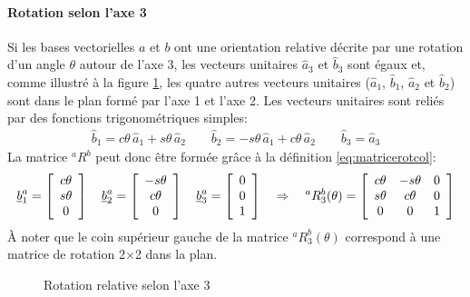 \paragraph{Rotation selon l'axe 3}
\label{sec:rot3}
%
Si les bases vectorielles $a$ et $b$ ont une orientation relative décrite par une rotation d'un angle $\theta$ autour de l'axe 3, les vecteurs unitaires $\hat{a}_3$ et $\hat{b}_3$ sont égaux et, comme illustré à la figure \ref{fig:r3vv}, les quatre autres vecteurs unitaires ($\hat{a}_1$, $\hat{b}_1$, $\hat{a}_2$ et $\hat{b}_2$) sont dans le plan formé par l'axe 1 et l'axe 2. Les vecteurs unitaires sont reliés par des fonctions trigonométriques simples: 
\begin{align}
\hat{b}_1 = c\theta \, \hat{a}_1 + s\theta \, \hat{a}_2 \quad\quad
\hat{b}_2 = -s\theta \, \hat{a}_1 + c\theta \, \hat{a}_2 \quad\quad
\hat{b}_3 = \hat{a}_3
\label{eq:rot3vecuni}
\end{align}
La matrice $^aR^b$ peut donc être formée grâce à la définition \eqref{eq:matricerotcol}:
\begin{align}
\underline{b}_1^a = \left[ \begin{array}{c} c\theta \\ s\theta \\ 0  \end{array} \right] \quad
\underline{b}_2^a = \left[ \begin{array}{c} -s\theta \\ c\theta \\ 0  \end{array} \right] \quad
\underline{b}_3^a = \left[ \begin{array}{c} 0 \\ 0 \\ 1  \end{array} \right]
\quad \Rightarrow \quad
^aR^b_3(\theta) = \left[ \begin{array}{c c c}
	c\theta & -s\theta & 0 \\
	s\theta & c\theta & 0 \\
	0 & 0 & 1 
\end{array}  \right]
\label{eq:rot3theta}
\end{align}
À noter que le coin supérieur gauche de la matrice $^aR^b_3(\theta)$ correspond à une matrice de rotation 2$\times$2 dans la plan.
%
\begin{figure}[H]
        \centering
				\hspace{+20pt}
        \caption{Rotation relative selon l'axe 3}
				\label{fig:r3vv}
\end{figure}
%


